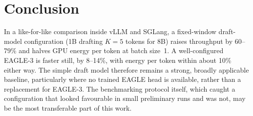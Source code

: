 \documentclass[conference]{IEEEtran}
\begin{document}
\section{Conclusion}

In a like-for-like comparison inside vLLM and SGLang, a fixed-window
draft-model configuration (1B drafting $K{=}5$ tokens for 8B) raises
throughput by 60--79\% and halves GPU energy per token at batch size~1. A
well-configured EAGLE-3 is faster still, by 8--14\%, with energy per token
within about 10\% either way. The simple draft model therefore remains a
strong, broadly applicable baseline, particularly where no trained EAGLE
head is available, rather than a replacement for EAGLE-3. The benchmarking
protocol itself, which caught a configuration that looked favourable in
small preliminary runs and was not, may be the most transferable part of
this work.
\end{document}

